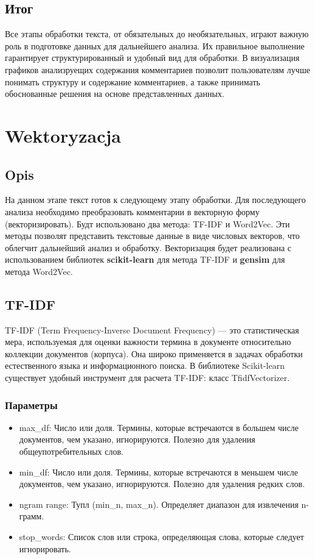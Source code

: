 	\subsection{Итог}
		Все этапы обработки текста, от обязательных до необязательных, играют важную роль в подготовке данных для дальнейшего анализа. Их правильное выполнение гарантирует структурированный и удобный вид для обработки. В визуализация графиков анализруещих содержания комментариев позволит пользователям лучше понимать структуру и содержание комментариев, а также принимать обоснованные решения на основе представленных данных.
	
	
\section{Wektoryzacja}
	
	\subsection{Opis}
		На данном этапе текст готов к следующему этапу обработки. Для последующего анализа необходимо преобразовать комментарии в векторную форму (векторизировать). Будт использовано два метода: TF-IDF и Word2Vec. Эти методы позволят представить текстовые данные в виде числовых векторов, что облегчит дальнейший анализ и обработку. Векторизация будет реализована с использованием библиотек \textbf{scikit-learn} для метода TF-IDF и \textbf{gensim} для метода Word2Vec.
	
	\subsection{TF-IDF}
 		TF-IDF (Term Frequency-Inverse Document Frequency) — это статистическая мера, используемая для оценки важности термина в документе относительно коллекции документов (корпуса). Она широко применяется в задачах обработки естественного языка и информационного поиска. В библиотеке Scikit-learn существует удобный инструмент для расчета TF-IDF: класс TfidfVectorizer.
		
		
		\subsubsection{Параметры }
			\begin{itemize}
				\item max\_df: Число или доля. Термины, которые встречаются в большем числе документов, чем указано, игнорируются. Полезно для удаления общеупотребительных слов.
				\item min\_df: Число или доля. Термины, которые встречаются в меньшем числе документов, чем указано, игнорируются. Полезно для удаления редких слов.
				\item ngram range: Тупл (min\_n, max\_n). Определяет диапазон для извлечения n-грамм.
				\item stop\_words: Список слов или строка, определяющая слова, которые следует игнорировать. 
			\end{itemize}
		

